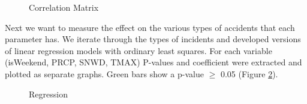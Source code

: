 \documentclass[conference]{IEEEtran}
\begin{document}
\begin{figure}[bth]
	\centering
	\caption{Correlation Matrix}
	\label{fig:cormap}
\end{figure}


Next we want to measure the effect on the various types of accidents that each parameter has. We iterate through the types of incidents and developed versions of linear regression models with ordinary least squares. For each variable (isWeekend, PRCP, SNWD, TMAX) P-values and coefficient were extracted and plotted as separate graphs. Green bars show a p-value $\geq$ 0.05 (Figure \ref{fig:ols}).   


\begin{figure}[bth]
	\centering
	\caption{Regression}
	\label{fig:ols}
\end{figure}
\end{document}

